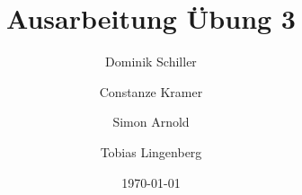 \documentclass[
ngerman,
twoside,
pdfa=false,
ruledheaders=section,%
class=report,%
thesis={type=sta},%
accentcolor=TUDa-2c,%
custommargins=false,%
marginpar=false,%
parskip=half-,%
fontsize=11pt,%
]{tudapub}
\begin{document}
	\title{Ausarbeitung Übung 3}
	\author[D. Schiller, C. Kramer, S.Arnold, T. Lingenberg]{Dominik Schiller \and Constanze Kramer \and Simon Arnold \and Tobias Lingenberg} %
	
	\department{} %

	
	\date{\today}
	
	
	\maketitle
	
	
	
	
	
	\cleardoublepage
	\tableofcontents %
	
	\setcounter{page}{1} %
	 
	
	
	
	
	
	
	
	
	
	\listoffigures %
	
	
	
\end{document}

